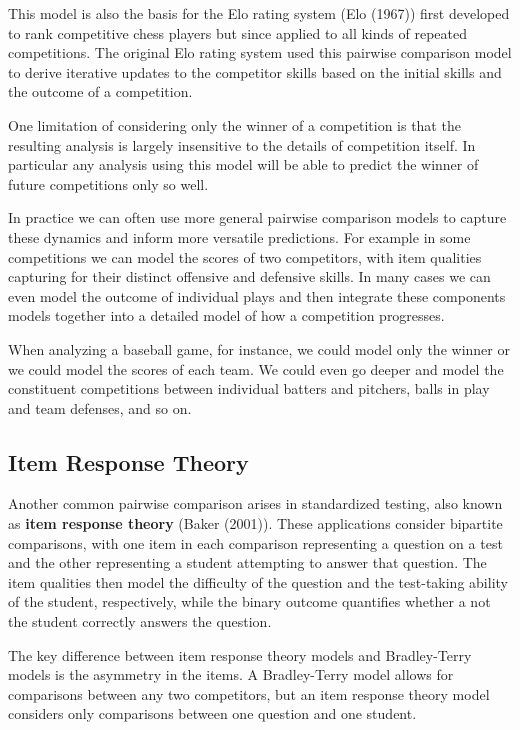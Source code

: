 \documentclass[
  letterpaper,
  DIV=11,
  numbers=noendperiod]{scrartcl}
\begin{document}
This model is also the basis for the Elo rating system (Elo (1967))
first developed to rank competitive chess players but since applied to
all kinds of repeated competitions. The original Elo rating system used
this pairwise comparison model to derive iterative updates to the
competitor skills based on the initial skills and the outcome of a
competition.

One limitation of considering only the winner of a competition is that
the resulting analysis is largely insensitive to the details of
competition itself. In particular any analysis using this model will be
able to predict the winner of future competitions only so well.

In practice we can often use more general pairwise comparison models to
capture these dynamics and inform more versatile predictions. For
example in some competitions we can model the scores of two competitors,
with item qualities capturing for their distinct offensive and defensive
skills. In many cases we can even model the outcome of individual plays
and then integrate these components models together into a detailed
model of how a competition progresses.

When analyzing a baseball game, for instance, we could model only the
winner or we could model the scores of each team. We could even go
deeper and model the constituent competitions between individual batters
and pitchers, balls in play and team defenses, and so on.

\subsection{Item Response Theory}\label{item-response-theory}

Another common pairwise comparison arises in standardized testing, also
known as \textbf{item response theory} (Baker (2001)). These
applications consider bipartite comparisons, with one item in each
comparison representing a question on a test and the other representing
a student attempting to answer that question. The item qualities then
model the difficulty of the question and the test-taking ability of the
student, respectively, while the binary outcome quantifies whether a not
the student correctly answers the question.

The key difference between item response theory models and Bradley-Terry
models is the asymmetry in the items. A Bradley-Terry model allows for
comparisons between any two competitors, but an item response theory
model considers only comparisons between one question and one student.
\end{document}
